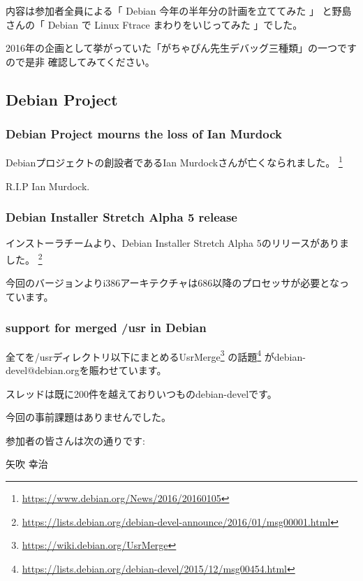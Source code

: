 \documentclass[mingoth,a4paper]{jsarticle}
\begin{document}
内容は参加者全員による「 Debian 今年の半年分の計画を立ててみた 」
と野島さんの「 Debian で Linux Ftrace まわりをいじってみた 」でした。

2016年の企画として挙がっていた「がちゃぴん先生デバッグ三種類」の一つですので是非
確認してみてください。

\subsection{Debian Project}

\subsubsection {Debian Project mourns the loss of Ian Murdock}

Debianプロジェクトの創設者であるIan Murdockさんが亡くなられました。
\footnote{\url{https://www.debian.org/News/2016/20160105}}

R.I.P Ian Murdock.

\subsubsection{Debian Installer Stretch Alpha 5 release}

インストーラチームより、Debian Installer Stretch Alpha 5のリリースがありました。
\footnote{\url{https://lists.debian.org/debian-devel-announce/2016/01/msg00001.html}}

今回のバージョンよりi386アーキテクチャは686以降のプロセッサが必要となっています。

\subsubsection{support for merged /usr in Debian}

全てを/usrディレクトリ以下にまとめるUsrMerge\footnote{\url{https://wiki.debian.org/UsrMerge}}
の話題\footnote{\url{https://lists.debian.org/debian-devel/2015/12/msg00454.html}}
がdebian-devel@debian.orgを賑わせています。

スレッドは既に200件を越えておりいつものdebian-develです。



今回の事前課題はありませんでした。

参加者の皆さんは次の通りです:

\begin{prework}{ 矢吹 幸治 }
\end{prework}
\end{document}
